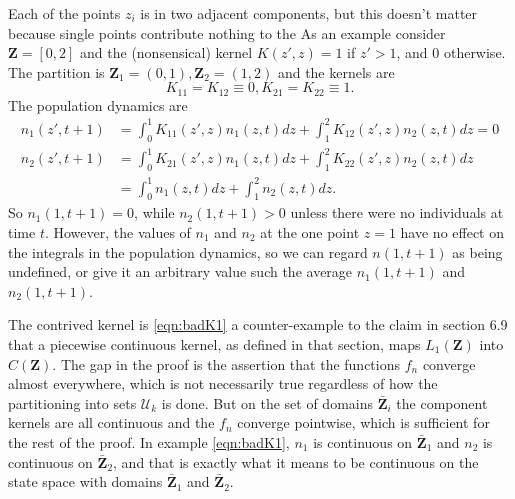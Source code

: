\documentclass[12pt]{article}
\numberwithin{Box}{section}
\def\Z{\mathbf{Z}}
\newcommand{\be}{\begin{equation}}
\newcommand{\ee}{\end{equation}}
\newcommand{\ba}{\begin{equation} \begin{aligned}}
\newcommand{\ea}{\end{aligned} \end{equation}}
\begin{document}
Each of the points $z_i$ is in two adjacent components, but this doesn't matter because  
single points contribute nothing to the 
As an example consider  $\Z = [0,2]$ and the (nonsensical) kernel $K(z',z) = 1$ 
if $z'>1$, and 0 otherwise. The partition is $\Z_1 = (0,1), \Z_2 = (1,2)$ and the kernels are 
\be
K_{11}=K_{12}\equiv 0, K_{21}=K_{22}\equiv 1.
\ee
The population dynamics are 
\ba
n_1(z',t+1) & = \int_0^1 K_{11}(z',z) n_1(z,t) dz + \int_1^2 K_{12}(z',z) n_2(z,t) dz  = 0 \\
n_2(z',t+1) & = \int_0^1 K_{21}(z',z) n_1(z,t) dz + \int_1^2 K_{22}(z',z) n_2(z,t) dz  \\
& =  \int_0^1 n_1(z,t) dz + \int_1^2 n_2(z,t) dz.  
\label{eqn:badK1}
\ea
So $n_1(1,t+1)=0$, while $n_2(1,t+1)>0$ unless there were no individuals at time $t$. 
However, the values of $n_1$ and $n_2$ at the one point $z=1$ have no effect on the
integrals in the population dynamics, so we can regard $n(1,t+1)$ as being undefined,
or give it an arbitrary value such the average $n_1(1,t+1)$ and $n_2(1,t+1)$. 

The contrived kernel is \eqref{eqn:badK1} a counter-example to the claim in section 6.9 that a 
piecewise continuous kernel, as defined in that section, maps $L_1(\Z)$ into $C(\Z)$. 
The gap in the proof is the assertion that the functions $f_n$ converge almost everywhere, 
which is not necessarily true regardless of how the partitioning into sets $\mathcal{U}_k$ is done. But on the 
set of domains $\bar{\Z}_{i}$ the component kernels are all continuous and the $f_n$ converge 
pointwise, which is sufficient for the rest of the proof. 
In example \eqref{eqn:badK1}, $n_1$ is continuous on $\bar{\Z}_1$ and 
$n_2$ is continuous on $\bar{\Z}_2$, and that is exactly what it means to be continuous
on the state space with domains $\bar{\Z}_1$ and $\bar{\Z}_2$.  
\end{document}
